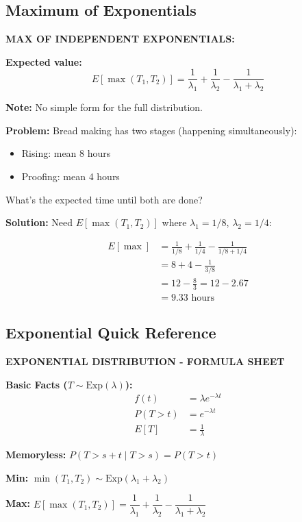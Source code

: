 \documentclass[10pt,letterpaper]{article}
\begin{document}
\subsection{Maximum of Exponentials}

\begin{formulabox}
\textbf{MAX OF INDEPENDENT EXPONENTIALS:}

\vspace{0.2cm}

\textbf{Expected value:}
\[
E[\max(T_1, T_2)] = \frac{1}{\lambda_1} + \frac{1}{\lambda_2} - \frac{1}{\lambda_1 + \lambda_2}
\]

\textbf{Note:} No simple form for the full distribution.
\end{formulabox}

\begin{examplebox}
\textbf{Problem:} Bread making has two stages (happening simultaneously):
\begin{itemize}
  \item Rising: mean 8 hours
  \item Proofing: mean 4 hours
\end{itemize}

What's the expected time until both are done?

\textbf{Solution:} Need $E[\max(T_1, T_2)]$ where $\lambda_1 = 1/8$, $\lambda_2 = 1/4$:

\begin{align*}
E[\max] &= \frac{1}{1/8} + \frac{1}{1/4} - \frac{1}{1/8 + 1/4} \\
&= 8 + 4 - \frac{1}{3/8} \\
&= 12 - \frac{8}{3} = 12 - 2.67 \\
&= \boxed{9.33 \text{ hours}}
\end{align*}
\end{examplebox}

\subsection{Exponential Quick Reference}

\begin{formulabox}
\textbf{EXPONENTIAL DISTRIBUTION - FORMULA SHEET}

\vspace{0.2cm}

\textbf{Basic Facts ($T \sim \text{Exp}(\lambda)$):}
\begin{align*}
f(t) &= \lambda e^{-\lambda t} \\
P(T > t) &= e^{-\lambda t} \\
E[T] &= \frac{1}{\lambda}
\end{align*}

\textbf{Memoryless:} $P(T > s+t \mid T > s) = P(T > t)$

\textbf{Min:} $\min(T_1, T_2) \sim \text{Exp}(\lambda_1 + \lambda_2)$

\textbf{Max:} $E[\max(T_1, T_2)] = \dfrac{1}{\lambda_1} + \dfrac{1}{\lambda_2} - \dfrac{1}{\lambda_1 + \lambda_2}$
\end{formulabox}
\end{document}
